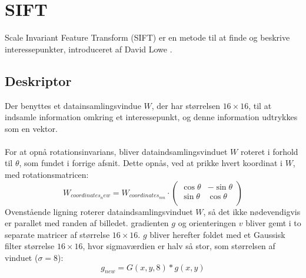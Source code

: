 \section{SIFT}
Scale Invariant Feature Transform (SIFT) er en metode til at finde og beskrive interessepunkter, introduceret af David Lowe \cite{SIFT}.


\subsection{Deskriptor}
Der benyttes et datainsamlingsvindue $W$, der har størrelsen $16 \times 16$, til at indsamle information omkring et interessepunkt, og denne information udtrykkes som en vektor.
\\
\\
For at opnå rotationsinvarians, bliver dataindsamlingsvinduet $W$ roteret i forhold til $\theta$, som fundet i forrige afsnit. Dette opnås, ved at prikke hvert koordinat i $W$, med rotationsmatricen:
\begin{equation}
W_{coordinates_new} = W_{coordinates_{mn}} \cdot
\begin{pmatrix}
  \cos \theta & -\sin \theta \\
  \sin \theta & \cos \theta  \\
\end{pmatrix}
\label{rotaionmatrix}
\end{equation}
Ovenstående ligning roterer dataindsamlingsvinduet $W$, så det ikke nødevendigvis er parallet med randen af billedet.
gradienten $g$ og orienteringen $v$ bliver gemt i to separate matricer af størrelse $16\times16$. $g$ bliver herefter foldet med et Gaussisk filter størrelse $16\times16$, hvor sigmaværdien er halv så stor, som størrelsen af vinduet ($\sigma=8$):
\begin{equation}
g_{new} = G(x,y,8) * g(x,y)
\label{gradientsmooth}
\end{equation}


